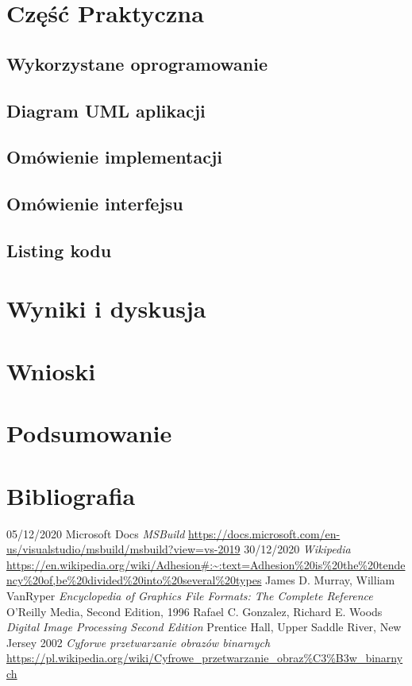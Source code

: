\documentclass{article}
\begin{document}
    \section{Część Praktyczna}
        \subsection{Wykorzystane oprogramowanie}
        \subsection{Diagram UML aplikacji}
        \subsection{Omówienie implementacji}
        \subsection{Omówienie interfejsu}
        \subsection{Listing kodu}
    \newpage
    \section{Wyniki i dyskusja}
    \newpage
    \section{Wnioski}
    \newpage
    \section{Podsumowanie}
    \newpage
    \section{Bibliografia}
    \begin{thebibliography}{9}
        05/12/2020
        Microsoft Docs
        \textit{MSBuild}
        \url{https://docs.microsoft.com/en-us/visualstudio/msbuild/msbuild?view=vs-2019}
        30/12/2020
        \textit{Wikipedia}
        \url{https://en.wikipedia.org/wiki/Adhesion#:~:text=Adhesion%20is%20the%20tendency%20of,be%20divided%20into%20several%20types}
        James D. Murray, William VanRyper
        \textit{Encyclopedia of Graphics File Formats: The Complete Reference}
        O'Reilly Media, Second Edition, 1996
        Rafael C. Gonzalez, Richard E. Woods
        \textit{Digital Image Processing Second Edition}
        Prentice Hall, Upper Saddle River, New Jersey 2002 
        \textit{Cyforwe przetwarzanie obrazów binarnych}
        \url{https://pl.wikipedia.org/wiki/Cyfrowe_przetwarzanie_obraz%C3%B3w_binarnych}
    \end{thebibliography}
    \newpage
    \listoffigures
\end{document}
